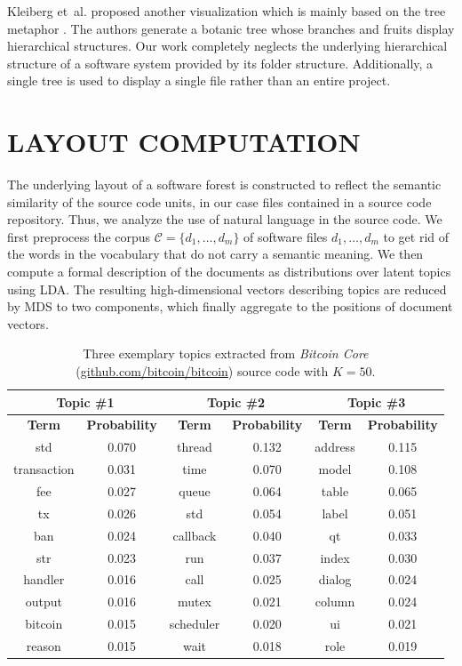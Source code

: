 \documentclass[a4paper,twoside]{article}
\begin{document}
Kleiberg et~al. proposed another visualization which is mainly based on the tree metaphor \cite{kleiberg2001botanical}.
The authors generate a botanic tree whose branches and fruits display hierarchical structures.
Our work completely neglects the underlying hierarchical structure of a software system provided by its folder structure.
Additionally, a single tree is used to display a single file rather than an entire project.

\section{\uppercase{Layout Computation}}
\label{sec:layout}
\noindent
The underlying layout of a software forest is constructed to reflect the semantic similarity of the source code units, in our case files contained in a source code repository.
Thus, we analyze the use of natural language in the source code.
We first preprocess the corpus $\mathcal{C} = \{ d_1, \dots, d_m \}$ of software files $d_1, \dots, d_m$ to get rid of the words in the vocabulary that do not carry a semantic meaning.
We then compute a formal description of the documents as distributions over latent topics using \ac{LDA}.
The resulting high-dimensional vectors describing topics are reduced by \ac{MDS} to two components, which finally aggregate to the positions of document vectors.

\begin{table}[t]
    \footnotesize
    \centering
	\setlength{\tabcolsep}{10.0pt}%
	\renewcommand{\arraystretch}{1.05}
    \begin{tabular}{c|c||c|c||c|c}
    \toprule
    \multicolumn{2}{c||}{\textbf{Topic \#1}} & \multicolumn{2}{c||}{\textbf{Topic \#2}} & \multicolumn{2}{c}{\textbf{Topic \#3}} \\ \midrule
    \textbf{Term} & \textbf{Probability} &
    \textbf{Term} & \textbf{Probability} & \textbf{Term} & \textbf{Probability}\\ \midrule
         std & 0.070 & thread & 0.132 & address & 0.115 \\
         transaction & 0.031 & time & 0.070 & model & 0.108 \\
         fee & 0.027 & queue & 0.064 & table & 0.065 \\
        tx & 0.026 & std & 0.054 & label & 0.051\\
        ban & 0.024 & callback & 0.040 & qt & 0.033\\
        str & 0.023 & run & 0.037 & index & 0.030 \\
        handler & 0.016 & call & 0.025 & dialog & 0.024 \\
        output & 0.016 & mutex & 0.021 & column & 0.024\\
        bitcoin & 0.015 & scheduler & 0.020 & ui & 0.021 \\
        reason & 0.015 & wait & 0.018 & role & 0.019 \\ \hline
    \end{tabular}
    \caption{Three exemplary topics extracted from \emph{Bitcoin Core} (\href{https://github.com/bitcoin/bitcoin}{github.com/bitcoin/bitcoin}) source code with $K = 50$.}
    \label{tab:topics_bitcoin}
\end{table}
\end{document}
